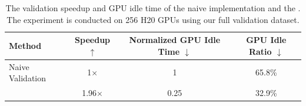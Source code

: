 \begin{table}[htbp]
    \centering
    \small
    \begin{tabular}{l|ccc}
    \toprule
    \textbf{Method} & \textbf{Speedup $\uparrow$} & \textbf{Normalized GPU Idle Time $\downarrow$} & \textbf{GPU Idle Ratio $\downarrow$} \\
    \midrule
    Naive Validation & 1$\times$ & 1 & 65.8\% \\
    \rlsys{} & 1.96$\times$ &  0.25 & 32.9\% \\
    \bottomrule
    \end{tabular}
    \caption{
        The validation speedup and GPU idle time of the naive implementation and the \rlsys{}. The experiment is conducted on 256 H20 GPUs using our full validation dataset.
    }
    \label{tab:rlinfra:val}
\end{table}
